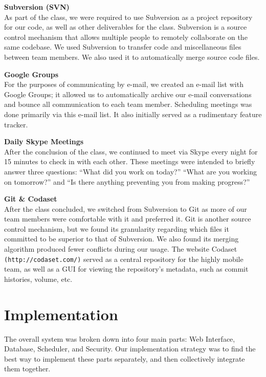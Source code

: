 \documentclass[12pt]{article}
\begin{document}
\begin{description}
\item{\textbf{Subversion (SVN)}} \\As part of the class, we were required to use Subversion as a project repository for our code, as well as other deliverables for the class. Subversion is a source control mechanism that allows multiple people to remotely collaborate on the same codebase. We used Subversion to transfer code and miscellaneous files between team members. We also used it to automatically merge source code files.
\item{\textbf{Google Groups}} \\For the purposes of communicating by e-mail, we created an e-mail list with Google Groups; it allowed us to automatically archive our e-mail conversations and bounce all communication to each team member. Scheduling meetings was done primarily via this e-mail list. It also initially served as a rudimentary feature tracker.
\item{\textbf{Daily Skype Meetings}} \\After the conclusion of the class, we continued to meet via Skype every night for 15 minutes to check in with each other. These meetings were intended to briefly answer three questions: ``What did you work on today?'' ``What are you working on tomorrow?'' and ``Is there anything preventing you from making progress?''
\item{\textbf{Git \& Codaset}} \\After the class concluded, we switched from Subversion to Git as more of our team members were comfortable with it and preferred it. Git is another source control mechanism, but we found its granularity regarding which files it committed to be superior to that of Subversion. We also found its merging algorithm produced fewer conflicts during our usage. The website Codaset \texttt{(http://codaset.com/)} served as a central repository for the highly mobile team, as well as a GUI for viewing the repository's metadata, such as commit histories, volume, etc.
\end{description}

\section{Implementation} %

 The overall system was broken down into four main parts: Web Interface, Database, Scheduler, and Security. Our implementation strategy was to find the best way to implement these parts separately, and then collectively integrate them together.
\end{document}
